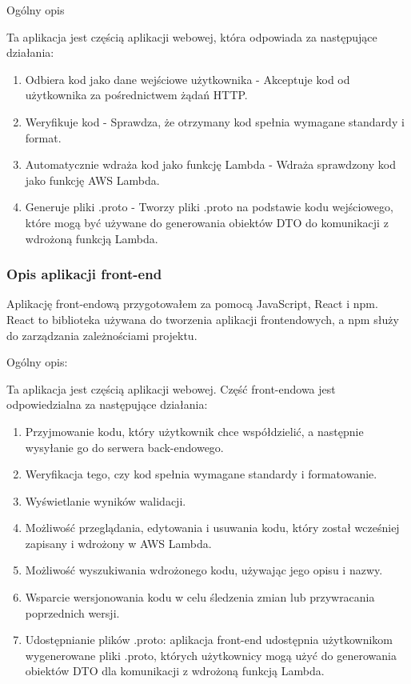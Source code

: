 \documentclass[runningheads,12pt]{llncs}
\begin{document}
Ogólny opis

Ta aplikacja jest częścią aplikacji webowej, która odpowiada za następujące działania:
\begin{enumerate}
    \item Odbiera kod jako dane wejściowe użytkownika - Akceptuje kod od użytkownika za pośrednictwem żądań HTTP.
    \item Weryfikuje kod - Sprawdza, że otrzymany kod spełnia wymagane standardy i format.
    \item Automatycznie wdraża kod jako funkcję Lambda -  Wdraża sprawdzony kod jako funkcję AWS Lambda.
    \item Generuje pliki .proto - Tworzy pliki .proto na podstawie kodu wejściowego, które mogą być używane do generowania obiektów DTO do komunikacji z wdrożoną funkcją Lambda.
\end{enumerate}


\subsubsection{Opis aplikacji front-end}

Aplikację front-endową przygotowałem za pomocą JavaScript, React i npm.
React to biblioteka używana do tworzenia aplikacji frontendowych, a npm służy do zarządzania zależnościami projektu.

Ogólny opis:

Ta aplikacja jest częścią aplikacji webowej. Część front-endowa jest odpowiedzialna za następujące działania:
\begin{enumerate}
    \item Przyjmowanie kodu, który użytkownik chce współdzielić, a następnie wysyłanie go do serwera back-endowego.
    \item Weryfikacja tego, czy kod spełnia wymagane standardy i formatowanie.
    \item Wyświetlanie wyników walidacji.
    \item Możliwość przeglądania, edytowania i usuwania kodu, który został wcześniej zapisany i wdrożony w AWS Lambda.
    \item Możliwość wyszukiwania wdrożonego kodu, używając jego opisu i nazwy.
    \item Wsparcie wersjonowania kodu w celu śledzenia zmian lub przywracania poprzednich wersji.
    \item Udostępnianie plików .proto: aplikacja front-end udostępnia użytkownikom wygenerowane pliki .proto, których użytkownicy mogą użyć do generowania obiektów DTO dla komunikacji z wdrożoną funkcją Lambda.
\end{enumerate}
\end{document}
